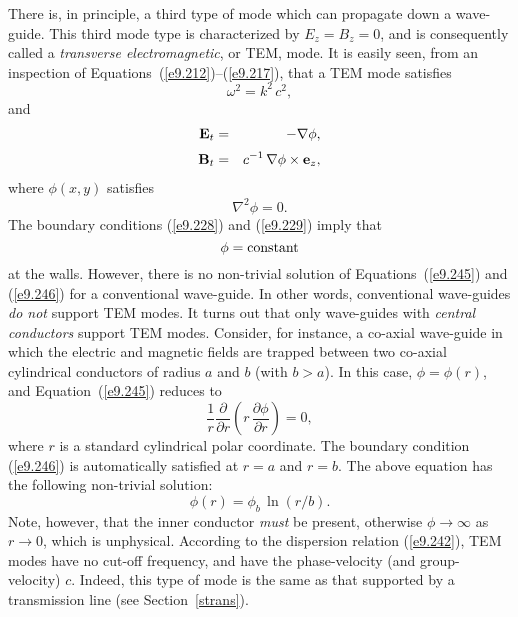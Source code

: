 There is, in principle, a third type of mode which can propagate down
a wave-guide. This third mode type is characterized by $E_z=B_z=0$,
and is consequently called a {\em transverse electromagnetic}, or
TEM, mode. It is easily seen, from an inspection of
Equations~(\ref{e9.212})--(\ref{e9.217}), that a TEM mode satisfies
\begin{equation}\label{e9.242}
\omega^2= k^2\,c^2,
\end{equation}
and
\begin{eqnarray}
{\bf E}_t &=& - \nabla\phi,\\[0.5ex]
{\bf B}_t &=& c^{-1}\,\nabla\phi\times{\bf e}_z,
\end{eqnarray}
where $\phi(x,y)$ satisfies
\begin{equation}\label{e9.245}
\nabla^2\phi = 0.
\end{equation}
The boundary conditions (\ref{e9.228}) and (\ref{e9.229}) imply
that
\begin{equation}\label{e9.246}
\phi = {\rm constant}
\end{equation}
at the walls. However, there is no non-trivial solution of Equations~(\ref{e9.245})
and (\ref{e9.246}) for a conventional wave-guide. In other words,
conventional wave-guides {\em do not} support TEM modes. 
It turns out that only wave-guides with {\em central conductors}
support TEM modes. Consider, for instance, a co-axial wave-guide
in which the electric and magnetic fields are trapped between two
co-axial cylindrical conductors of radius $a$ and $b$ (with $b>a$).
In this case, $\phi=\phi(r)$, and Equation~(\ref{e9.245}) reduces to
\begin{equation}
\frac{1}{r}\frac{\partial}{\partial r}\left( r\,\frac{\partial \phi}{\partial r}\right) = 0,
\end{equation}
where $r$ is a standard cylindrical polar coordinate.
The boundary condition (\ref{e9.246}) is automatically satisfied at $r=a$ and
$r=b$. 
The above equation has the following non-trivial solution:
\begin{equation}
\phi(r) = \phi_b\,\ln(r/b).
\end{equation}
Note, however, that the inner conductor {\em must} be present, otherwise
$\phi\rightarrow\infty$ as $r\rightarrow 0$, which is unphysical.
According to the dispersion relation (\ref{e9.242}), TEM modes have
no cut-off frequency, and have the phase-velocity (and group-velocity) $c$.
Indeed, this type of mode is the same as that supported by a transmission line
(see Section~\ref{strans}).

